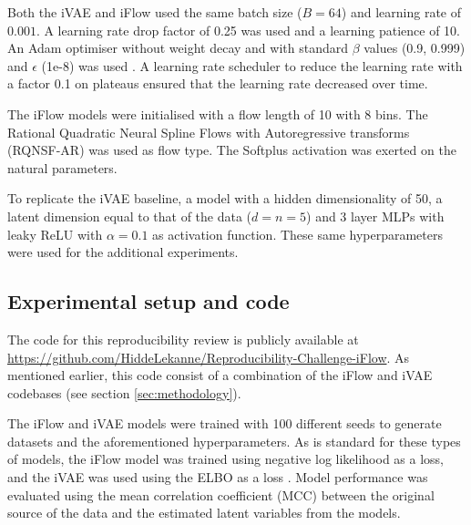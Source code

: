 Both the iVAE and iFlow used the same batch size ($B = 64$) and learning rate of $0.001$. A learning rate drop factor of 0.25 was used and a learning patience of 10. An Adam optimiser without weight decay and with standard $\beta$ values (0.9, 0.999) and $\epsilon$ (1e-8) was used \cite{kingma2014adam}. A learning rate scheduler to reduce the learning rate with a factor 0.1 on plateaus ensured that the learning rate decreased over time.

The iFlow models were initialised with a flow length of 10 with 8 bins. The Rational Quadratic Neural Spline Flows with Autoregressive transforms (RQNSF-AR) was used as flow type. The Softplus activation was exerted on the natural parameters.

To replicate the iVAE baseline, a model with a hidden dimensionality of 50, a latent dimension equal to that of the data ($d = n = 5$) and 3 layer MLPs with leaky ReLU with $\alpha = 0.1$ as activation function. These same hyperparameters were used for the additional experiments.

\subsection{Experimental setup and code}
The code for this reproducibility review is publicly available at \url{https://github.com/HiddeLekanne/Reproducibility-Challenge-iFlow}. As mentioned earlier, this code consist of a combination of the iFlow and iVAE codebases (see section \ref{sec:methodology}).

The iFlow and iVAE models were trained with 100 different seeds to generate datasets and the aforementioned hyperparameters. As is standard for these types of models, the iFlow model was trained using negative log likelihood as a loss, and the iVAE was used using the ELBO as a loss \cite{kingma2013auto}.
Model performance was evaluated using the mean correlation coefficient (MCC) between the original source of the data and the estimated latent variables from the models.

